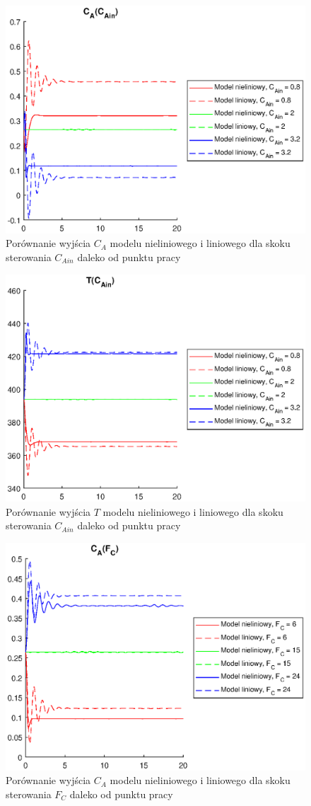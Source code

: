 \begin{figure}
	\centering
	\includegraphics[width=.8\linewidth]{plot/lin_cacain_1.eps}
	\caption{Porównanie wyjścia $C_A$ modelu nieliniowego i liniowego dla skoku sterowania $C_{Ain}$ daleko od punktu pracy}
	\label{fig:lincacain1}
\end{figure}
\begin{figure}
	\centering
	\includegraphics[width=.8\linewidth]{plot/lin_tcain_1.eps}
	\caption{Porównanie wyjścia $T$ modelu nieliniowego i liniowego dla skoku sterowania $C_{Ain}$ daleko od punktu pracy}
	\label{fig:lintcain1}
\end{figure}
\begin{figure}
	\centering
	\includegraphics[width=.8\linewidth]{plot/lin_cafc_1.eps}
	\caption{Porównanie wyjścia $C_A$ modelu nieliniowego i liniowego dla skoku sterowania $F_C$ daleko od punktu pracy}
\end{figure}
